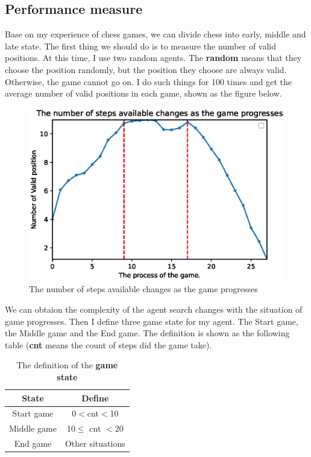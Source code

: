 \documentclass[conference,compsoc]{IEEEtran}
\begin{document}
\subsection{Performance measure}
Base on my experience of chess games, we can divide chess into early, middle and late state. The first thing we should do is to measure the number of valid positions. At this time, I use two random agents. The \textbf{random} means that they choose the position randomly, but the position they choose are always valid. Otherwise, the game cannot go on. I do such things for 100 times and get the average number of valid positions in each game, shown as the figure below.

\begin{figure}[htbp]
\begin{center}
\includegraphics[width=.4\textwidth]{fig/1.eps}
\end{center}
\caption{The number of steps available changes as the game progresses}
\label{Fig4}
\end{figure}

We can obtaion the complexity of the agent search changes with the situation of game progresses. Then I define three game state for my agent. The Start game, the Middle game and the End game. The definition is shown as the following table (\textbf{cnt} means the count of steps did the game take).

\begin{table}[htbp]
\begin{center}
\begin{tabular}{@{}cc@{}}
\toprule
State       & Define           \\ \midrule
Start game  & 0$<$cnt$<$10         \\
Middle game & 10$\le$ cnt $<$20  \\
End game    & Other situations \\ \bottomrule
\end{tabular}
\end{center}
\caption{The definition of the \textbf{game state}}
\label{tab2}
\end{table}
\end{document}
